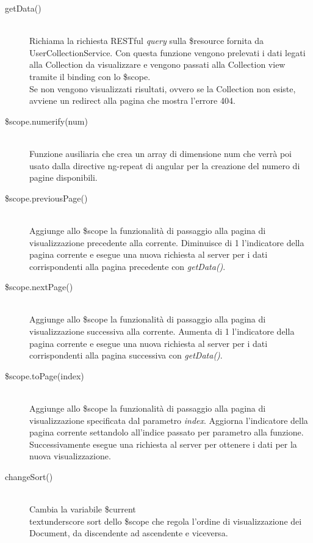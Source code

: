 \begin{description}
\begin{description}
  \item[getData()] \hfill \\
  Richiama la richiesta RESTful \textit{query} sulla \$resource fornita da UserCollectionService.
  Con questa funzione vengono prelevati i dati legati alla Collection da visualizzare e vengono
  passati alla Collection view tramite il binding con lo \$scope. \\
  Se non vengono visualizzati risultati, ovvero se la Collection non esiste, avviene un redirect alla pagina
  che mostra l'errore 404.
  
  \item[\$scope.numerify(num)] \hfill \\
  Funzione ausiliaria che crea un array di dimensione   {num} che verrà poi usato dalla directive   {ng-repeat} di angular per la creazione 
  del numero di pagine  disponibili.
  
  \item[\$scope.previousPage()] \hfill \\
  Aggiunge allo \$scope la funzionalità di passaggio alla pagina di visualizzazione precedente alla corrente.
  Diminuisce di 1 l'indicatore della pagina corrente e esegue una nuova richiesta al server per i dati corrispondenti
  alla pagina precedente con \emph{getData()}.
  
  \item[\$scope.nextPage()] \hfill \\
  Aggiunge allo \$scope la funzionalità di passaggio alla pagina di visualizzazione successiva alla corrente.
  Aumenta di 1 l'indicatore della pagina corrente e esegue una nuova richiesta al server per i dati corrispondenti
  alla pagina successiva con \emph{getData()}.
  
  \item[\$scope.toPage(index)] \hfill \\
  Aggiunge allo \$scope la funzionalità di passaggio alla pagina di visualizzazione specificata dal parametro \emph{index}.
  Aggiorna l'indicatore della pagina corrente settandolo all'indice passato per parametro alla funzione.
  Successivamente esegue una richiesta al server per ottenere i dati per la nuova visualizzazione.
  
  \item[changeSort()] \hfill \\
  Cambia la variabile \$current\\textunderscore sort dello \$scope che regola l'ordine di visualizzazione dei Document, da discendente ad
  ascendente e viceversa.
  

\end{description}
\end{description}
